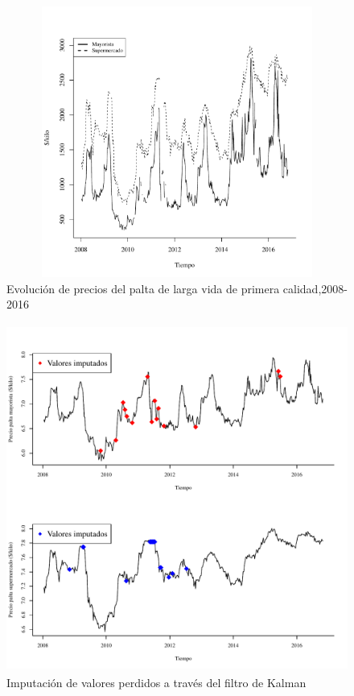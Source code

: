 \documentclass[12pt, twoside]{book}\usepackage[]{graphicx}\usepackage[]{color}
\newenvironment{knitrout}{}{} %
\numberwithin{equation}{section}
\numberwithin{theorem}{section}
\numberwithin{teorema}{section}
\numberwithin{defi}{section}
\numberwithin{prop}{section}
\numberwithin{defi}{section}
\theoremstyle{plain}
\begin{document}
\begin{knitrout}
\color{fgcolor}\begin{figure}[H]

{\centering \includegraphics[width=6.5in,height=3.5in]{figure/fig-1-1} 

}

\caption[Evolución de precios del palta de larga vida de primera calidad,2008-2016]{Evolución de precios del palta de larga vida de primera calidad,2008-2016}\label{fig:fig-1}
\end{figure}


\end{knitrout}


\begin{knitrout}
\color{fgcolor}\begin{figure}[H]

{\centering \includegraphics[width=6.5in,height=4.5in]{figure/fig-2-1} 

}

\caption[Imputación de valores perdidos a través del filtro de Kalman]{Imputación de valores perdidos a través del filtro de Kalman}\label{fig:fig-2}
\end{figure}


\end{knitrout}
\end{document}
